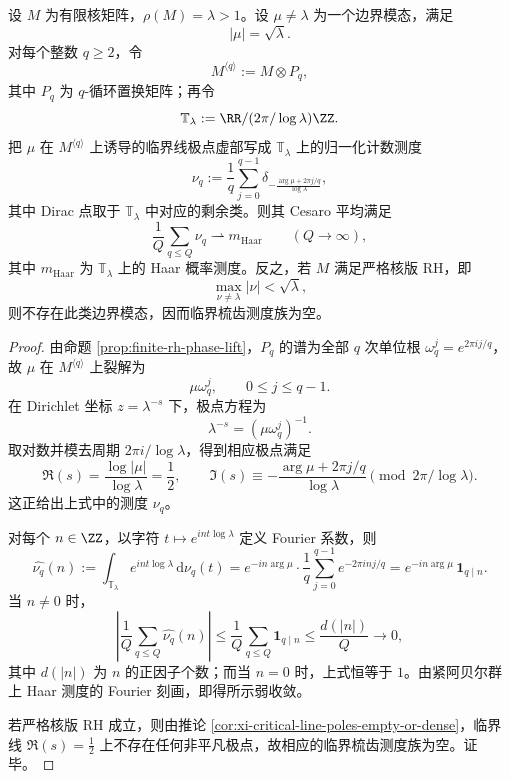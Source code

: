 \begin{theorem}\label{thm:conclusion-critical-comb-cesaro-haar}
设 \(M\) 为有限核矩阵，\(\rho(M)=\lambda>1\)。设 \(\mu\neq\lambda\) 为一个边界模态，满足
\[
|\mu|=\sqrt{\lambda}.
\]
对每个整数 \(q\ge 2\)，令
\[
M^{\langle q\rangle}:=M\otimes P_q,
\]
其中 \(P_q\) 为 \(q\)-循环置换矩阵；再令
\[
\mathbb T_\lambda:=\RR/(2\pi/\log\lambda)\ZZ.
\]
把 \(\mu\) 在 \(M^{\langle q\rangle}\) 上诱导的临界线极点虚部写成 \(\mathbb T_\lambda\) 上的归一化计数测度
\[
\nu_q:=
\frac{1}{q}\sum_{j=0}^{q-1}
\delta_{-\frac{\arg\mu+2\pi j/q}{\log\lambda}},
\]
其中 Dirac 点取于 \(\mathbb T_\lambda\) 中对应的剩余类。则其 Cesaro 平均满足
\[
\frac1Q\sum_{q\le Q}\nu_q \rightharpoonup m_{\mathrm{Haar}}
\qquad (Q\to\infty),
\]
其中 \(m_{\mathrm{Haar}}\) 为 \(\mathbb T_\lambda\) 上的 Haar 概率测度。反之，若 \(M\) 满足严格核版 RH，即
\[
\max_{\nu\neq \lambda}|\nu|<\sqrt{\lambda},
\]
则不存在此类边界模态，因而临界梳齿测度族为空。
\end{theorem}
\begin{proof}
由命题 \ref{prop:finite-rh-phase-lift}，\(P_q\) 的谱为全部 \(q\) 次单位根 \(\omega_q^j=e^{2\pi i j/q}\)，故 \(\mu\) 在 \(M^{\langle q\rangle}\) 上裂解为
\[
\mu\omega_q^j,\qquad 0\le j\le q-1.
\]
在 Dirichlet 坐标 \(z=\lambda^{-s}\) 下，极点方程为
\[
\lambda^{-s}=(\mu\omega_q^j)^{-1}.
\]
取对数并模去周期 \(2\pi i/\log\lambda\)，得到相应极点满足
\[
\Re(s)=\frac{\log|\mu|}{\log\lambda}=\frac12,
\qquad
\Im(s)\equiv -\frac{\arg\mu+2\pi j/q}{\log\lambda}
\pmod{2\pi/\log\lambda}.
\]
这正给出上式中的测度 \(\nu_q\)。

对每个 \(n\in\ZZ\)，以字符 \(t\mapsto e^{in t\log\lambda}\) 定义 Fourier 系数，则
\[
\widehat{\nu_q}(n)
:=
\int_{\mathbb T_\lambda}e^{in t\log\lambda}\,\mathrm d\nu_q(t)
=
e^{-in\arg\mu}\cdot \frac1q\sum_{j=0}^{q-1}e^{-2\pi i nj/q}
=
e^{-in\arg\mu}\,\mathbf 1_{q\mid n}.
\]
当 \(n\neq 0\) 时，
\[
\left|
\frac1Q\sum_{q\le Q}\widehat{\nu_q}(n)
\right|
\le
\frac1Q\sum_{q\le Q}\mathbf 1_{q\mid n}
\le
\frac{d(|n|)}{Q}
\longrightarrow 0,
\]
其中 \(d(|n|)\) 为 \(n\) 的正因子个数；而当 \(n=0\) 时，上式恒等于 \(1\)。由紧阿贝尔群上 Haar 测度的 Fourier 刻画，即得所示弱收敛。

若严格核版 RH 成立，则由推论 \ref{cor:xi-critical-line-poles-empty-or-dense}，临界线 \(\Re(s)=\tfrac12\) 上不存在任何非平凡极点，故相应的临界梳齿测度族为空。证毕。
\end{proof}

